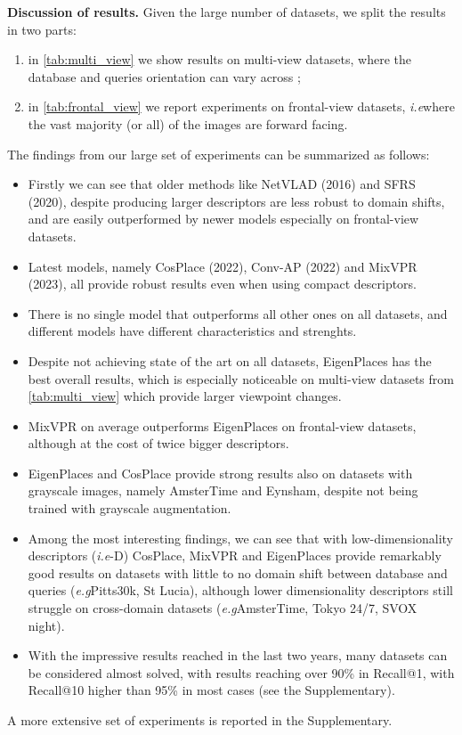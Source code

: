 \documentclass[10pt,twocolumn,letterpaper]{article}
\def\eg{\emph{e.g}\onedot}
\def\ie{\emph{i.e}\onedot}
\newcommand{\myparagraph}[1]{\vspace{4pt}\noindent\textbf{#1}}
\begin{document}
\myparagraph{Discussion of results.}
Given the large number of datasets, we split the results in two parts:
\begin{enumerate}[noitemsep,topsep=1pt]
    \item in \cref{tab:multi_view} we show results on multi-view datasets, where the database and queries orientation can vary across  ;
    \item in \cref{tab:frontal_view} we report experiments on frontal-view datasets, \ie where the vast majority (or all) of the images are forward facing.
\end{enumerate}
The findings from our large set of experiments can be summarized as follows:
\begin{itemize}[noitemsep,topsep=1pt]
\item Firstly we can see that older methods like NetVLAD (2016) and SFRS (2020), despite producing larger descriptors are less robust to domain shifts, and are easily outperformed by newer models especially on frontal-view datasets.
\item Latest models, namely CosPlace (2022), Conv-AP (2022) and MixVPR (2023), all provide robust results even when using compact descriptors.
\item There is no single model that outperforms all other ones on all datasets, and different models have different characteristics and strenghts.
\item Despite not achieving state of the art on all datasets, EigenPlaces has the best overall results, which is especially noticeable on multi-view datasets from \cref{tab:multi_view} which provide larger viewpoint changes.
\item MixVPR on average outperforms EigenPlaces on frontal-view datasets, although at the cost of twice bigger descriptors.
\item EigenPlaces and CosPlace provide strong results also on datasets with grayscale images, namely AmsterTime and Eynsham, despite not being trained with grayscale augmentation.
\item Among the most interesting findings, we can see that with low-dimensionality descriptors (\ie 128-D) CosPlace, MixVPR and EigenPlaces provide remarkably good results on datasets with little to no domain shift between database and queries (\eg Pitts30k, St Lucia), although lower dimensionality descriptors still struggle on cross-domain datasets (\eg AmsterTime, Tokyo 24/7, SVOX night).
\item With the impressive results reached in the last two years, many datasets can be considered almost solved, with results reaching over 90\% in Recall@1, with Recall@10 higher than 95\% in most cases (see the Supplementary).
\end{itemize}
A more extensive set of experiments is reported in the Supplementary.
\end{document}
